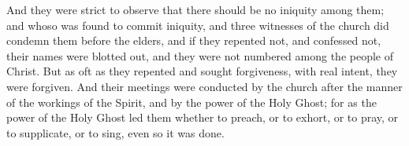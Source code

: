 And they were strict to observe that there should be no iniquity among them; and whoso was found to commit iniquity, and three witnesses of the church did condemn them before the elders, and if they repented not, and confessed not, their names were blotted out, and they were not numbered among the people of Christ.
\bverse \iffalse But as oft as they repented and sought forgiveness, with real intent, they were forgiven. \fi
But as oft as they repented and sought forgiveness, with real intent, they were forgiven.
\bverse \iffalse And their meetings were conducted by the church after the manner of the workings of the Spirit, and by the power of the Holy Ghost; for as the power of the Holy Ghost led them whether to preach, or to exhort, or to pray, or to supplicate, or to sing, even so it was done. \fi
And their meetings were conducted by the church after the manner of the workings of the Spirit, and by the power of the Holy Ghost; for as the power of the Holy Ghost led them whether to preach, or to exhort, or to pray, or to supplicate, or to sing, even so it was done.

